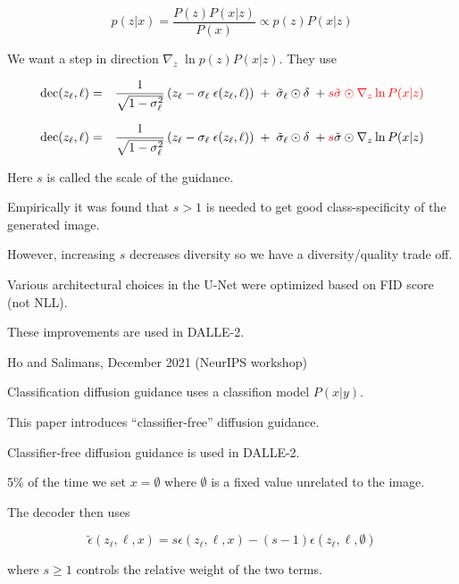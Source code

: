 {\vfill
$$p(z|x) = \frac{P(z)P(x|z)}{P(x)} \propto p(z)P(x|z)$$

\vfill
We want a step in direction $\nabla_z\;\ln p(z)P(x|z)$. They use

{\huge
\begin{eqnarray*}
  \mathrm{dec}(z_\ell,\ell) & = & \frac{1}{\sqrt{1-\sigma_\ell^2}}\left(z_\ell - \sigma_\ell\; \epsilon(z_\ell,\ell)\right) \; +\; \tilde{\sigma}_\ell\odot\delta\; + {\color{red} s\tilde{\sigma}\odot\nabla_{z} \ln P(x|z)}
\end{eqnarray*}
}


{\huge
\begin{eqnarray*}
  \mathrm{dec}(z_\ell,\ell) & = & \frac{1}{\sqrt{1-\sigma_\ell^2}}\left(z_\ell - \sigma_\ell\; \epsilon(z_\ell,\ell)\right) \; +\; \tilde{\sigma}_\ell\odot\delta\; + {\color{red} s}\tilde{\sigma}\odot\nabla_{z} \ln P(x|z)
\end{eqnarray*}
}

Here $s$ is called the scale of the guidance.

\vfill
Empirically it was found that $s > 1$ is needed to get good class-specificity of the generated image.

\vfill
However, increasing $s$ decreases diversity so we have a diversity/quality trade off.


Various architectural choices in the U-Net were optimized based on FID score (not NLL).

\vfill
These improvements are used in DALLE-2.


{Ho and Salimans, December 2021 (NeurIPS workshop)}

Classification diffusion guidance uses a classifion model $P(x|y)$.

\vfill
This paper introduces ``classifier-free'' diffusion guidance.

\vfill
Classifier-free diffusion guidance is used in DALLE-2.


5\% of the time we set $x = \emptyset$ where $\emptyset$ is a fixed value unrelated to the image.

\vfill
The decoder then uses

$$\tilde{\epsilon}(z_\ell,\ell,x) = s\epsilon(z_\ell,\ell,x) - (s-1)\epsilon(z_\ell,\ell,\emptyset)$$

\vfill
where $s \geq 1$ controls the relative weight of the two terms.

}
